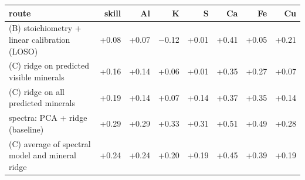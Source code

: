 \begin{tabular}{lrrrrrrr}
\toprule
route & skill & Al & K & S & Ca & Fe & Cu \\
\midrule
(B) stoichiometry + linear calibration (LOSO) & +0.08 & +0.07 & $-$0.12 & +0.01 & +0.41 & +0.05 & +0.21 \\
(C) ridge on predicted visible minerals & +0.16 & +0.14 & +0.06 & +0.01 & +0.35 & +0.27 & +0.07 \\
(C) ridge on all predicted minerals & +0.19 & +0.14 & +0.07 & +0.14 & +0.37 & +0.35 & +0.14 \\
spectra: PCA + ridge (baseline) & +0.29 & +0.29 & +0.33 & +0.31 & +0.51 & +0.49 & +0.28 \\
(C) average of spectral model and mineral ridge & +0.24 & +0.24 & +0.20 & +0.19 & +0.45 & +0.39 & +0.19 \\
\bottomrule
\end{tabular}
